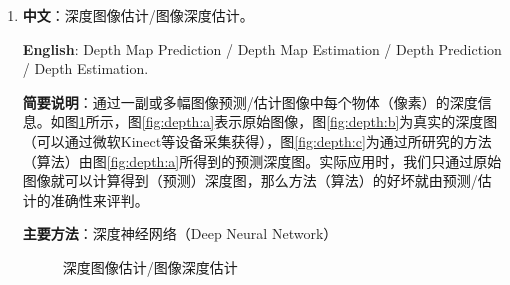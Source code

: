 \documentclass[14pt,a4paper]{extarticle}
\begin{document}
\begin{enumerate}
\item \textbf{中文}：深度图像估计/图像深度估计。

\textbf{English}: Depth Map Prediction / Depth Map Estimation / Depth Prediction / Depth Estimation.

\textbf{简要说明}：通过一副或多幅图像预测/估计图像中每个物体（像素）的深度信息。如图\ref{fig:depth}所示，图\ref{fig:depth:a}表示原始图像，图\ref{fig:depth:b}为真实的深度图（可以通过微软Kinect等设备采集获得），图\ref{fig:depth:c}为通过所研究的方法（算法）由图\ref{fig:depth:a}所得到的预测深度图。实际应用时，我们只通过原始图像就可以计算得到（预测）深度图，那么方法（算法）的好坏就由预测/估计的准确性来评判。

\textbf{主要方法}：深度神经网络（Deep Neural Network）
\begin{figure}[!ht]
  \centering
  \caption{深度图像估计/图像深度估计}
  \label{fig:depth} %
\end{figure}


\end{enumerate}
\end{document}
